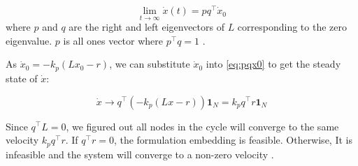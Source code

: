 \documentclass[letterpaper, 10 pt, conference]{ieeeconf}  %
\begin{document}
\begin{equation}\label{eq:pqx0}
    \lim_{t \to \infty} \dot{x}(t) = pq^\top \dot{x}_0
\end{equation}
\noindent where \( p \) and \( q \) are the right and left eigenvectors of \(L\) corresponding to the zero eigenvalue. \(p\) is all ones vector where \(p^\top q = 1\) \cite{olfati-saber_consensus_2007}. 

As \(\dot{x}_0 = -k_p(Lx_0 - r)\), we can substitute \(\dot{x}_0\) into \eqref{eq:pqx0} to get the steady state of \(\dot{x}\):

\begin{equation}\label{eq:steady}
    \dot{x} \rightarrow    q^\top (-k_p (Lx -r))\mathbf{1}_N
    = k_p q^\top r \mathbf{1}_N
\end{equation}

\noindent Since \(q^\top L = 0\), we figured out all nodes in the cycle will converge to the same velocity \(k_p q^\top r\). If \(q^\top r = 0\), the formulation embedding is feasible. Otherwise, It is infeasible and the system will converge to a non-zero velocity \cite{dimarogonas_connection_2008}. 





\end{document}
